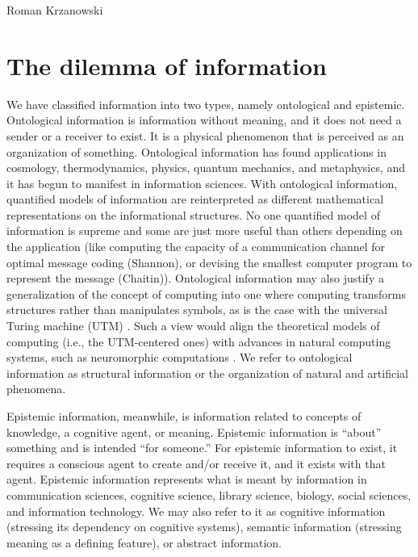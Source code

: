 \begin{artengenv}{Roman Krzanowski}
\section{The dilemma of information}
We have classified information into two types, namely ontological and epistemic. Ontological information is information without meaning, and it does not need a sender or a receiver to exist. It is a physical phenomenon that is perceived as an organization of something. Ontological information has found applications in cosmology, thermodynamics, physics, quantum mechanics, and metaphysics, and it has begun to manifest in information sciences. With ontological information, quantified models of information are reinterpreted as different mathematical representations on the informational structures. No one quantified model of information is supreme and some are just more useful than others depending on the application (like computing the capacity of a communication channel for optimal message coding (Shannon), or devising the smallest computer program to represent the message (Chaitin)). Ontological information may also justify a generalization of the concept of computing into one where computing transforms structures rather than manipulates symbols, as is the case with the universal Turing machine (UTM)
\parencites[][]{dodig-crnkovic_alan_2012}[][]{hidalgo_why_2015}. %
 Such a view would align the theoretical models of computing (i.e., the UTM-centered ones) with advances in natural computing systems, such as neuromorphic computations 
\parencite[e.g.][]{shanahan_technological_2015}. %
 We refer to ontological information as structural information or the organization of natural and artificial phenomena.

Epistemic information, meanwhile, is information related to concepts of knowledge, a cognitive agent, or meaning. Epistemic information is ``about'' something and is intended ``for someone.'' For epistemic information to exist, it requires a conscious agent to create and/or receive it, and it exists with that agent. Epistemic information represents what is meant by information in communication sciences, cognitive science, library science, biology, social sciences, and information technology. We may also refer to it as cognitive information (stressing its dependency on cognitive systems), semantic information (stressing meaning as a defining feature), or abstract information.


\end{artengenv}
